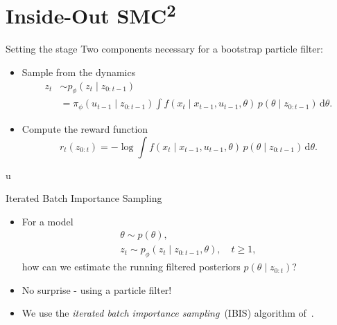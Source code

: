 \documentclass[10pt, aspectratio=1610]{beamer}
\newcommand{\dd}{\mathrm{d}}
\begin{document}
  \section{Inside-Out \texorpdfstring{SMC\textsuperscript{2}}{SMC2}}
    \begin{frame}{Setting the stage}
      Two components necessary for a bootstrap particle filter:
      \begin{itemize}[<+->]
        \item Sample from the dynamics
          \begin{align}
            z_t &\sim p_\phi(z_t \mid z_{0:t-1}) \\
            &= \pi_\phi(u_{t-1} \mid z_{0:t-1}) \int f(x_t \mid x_{t-1}, u_{t-1}, \theta) \, p(\theta \mid z_{0:t-1}) \, \dd \theta.
          \end{align}
        \item Compute the reward function
          \begin{equation}
            r_t(z_{0:t}) = - \log \int f(x_t \mid x_{t-1}, u_{t-1}, \theta) \, p(\theta \mid z_{0:t-1}) \, \dd \theta.
          \end{equation}
      \end{itemize}
u    \end{frame}

    \begin{frame}{Iterated Batch Importance Sampling}
      \begin{itemize}[<+->]
        \setlength\itemsep{1.5em}
        \item For a model
          \begin{gather}
            \theta \sim p(\theta), \\
            z_t \sim p_\phi(z_t \mid z_{0:t-1}, \theta), \quad t \geq 1,
          \end{gather}
          how can we estimate the running filtered posteriors $p(\theta \mid z_{0:t})$?
        \item No surprise - using a particle filter!
        \item We use the \emph{iterated batch importance sampling}~(IBIS) algorithm of~\citet{chopin2002sequential}.
      \end{itemize}
    \end{frame}
\end{document}
